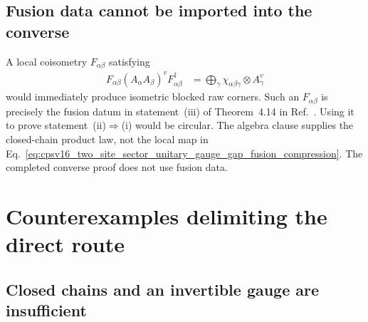 \documentclass{article}
\begin{document}
\subsection{Fusion data cannot be imported into the converse}

A local coisometry $F_{\alpha\beta}$ satisfying
\begin{align}
    F_{\alpha\beta}(A_\alpha A_\beta)^vF_{\alpha\beta}^\dagger
    &=\bigoplus_\gamma
      \chi_{\alpha\beta\gamma}\otimes A_\gamma^v
    \label{eq:cpsv16_two_site_sector_unitary_gauge_gap_fusion_compression}
\end{align}
would immediately produce isometric blocked raw corners. Such an
$F_{\alpha\beta}$ is precisely the fusion datum in statement~(iii) of
Theorem~4.14 in Ref.~\cite{Cirac2016MPDO_arXiv}. Using it to prove
statement~(ii)$\Rightarrow$(i) would be circular. The algebra clause supplies
the closed-chain product law, not the local map in
Eq.~\ref{eq:cpsv16_two_site_sector_unitary_gauge_gap_fusion_compression}. The
completed converse proof does not use fusion data.

\section{Counterexamples delimiting the direct route}

\subsection{Closed chains and an invertible gauge are insufficient}
\end{document}
